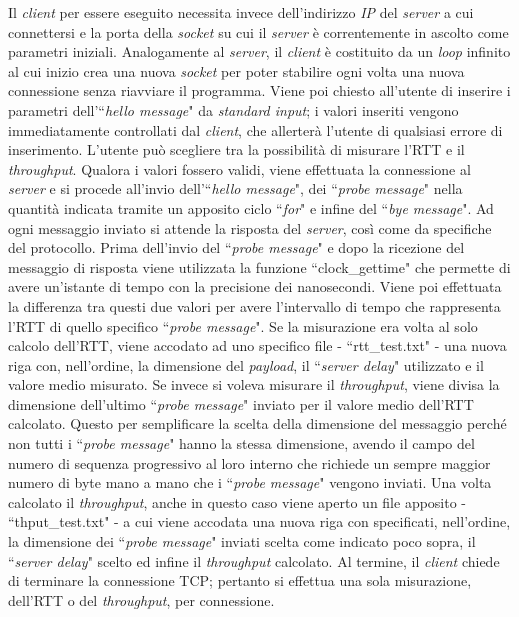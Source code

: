 \documentclass[a4paper, 12pt]{report}
\begin{document}
Il \textit{client} per essere eseguito necessita invece dell'indirizzo \textit{IP} del \textit{server} a cui connettersi e la porta della
\textit{socket} su cui il \textit{server} è correntemente in ascolto come parametri iniziali.\newline
Analogamente al \textit{server}, il \textit{client} è costituito da un \textit{loop} infinito al cui inizio crea una nuova \textit{socket} per poter 
stabilire ogni volta una nuova connessione senza riavviare il programma. Viene poi chiesto all'utente di inserire i parametri dell'``\textit{hello 
message}" da \textit{standard input}; i valori inseriti vengono immediatamente controllati dal \textit{client}, che allerterà l'utente di qualsiasi
errore di inserimento. L'utente può scegliere tra la possibilità di misurare l'RTT e il \textit{throughput}. Qualora i valori fossero validi,
viene effettuata la connessione al \textit{server} e si procede all'invio dell'``\textit{hello message}", dei ``\textit{probe message}" nella
quantità indicata tramite un apposito ciclo ``\textit{for}" e infine del ``\textit{bye message}". Ad ogni messaggio inviato si attende la risposta
del \textit{server}, così come da specifiche del protocollo.\newline
Prima dell'invio del ``\textit{probe message}" e dopo la ricezione del messaggio di risposta viene utilizzata la funzione ``clock\_gettime" che
permette di avere un'istante di tempo con la precisione dei nanosecondi. Viene poi effettuata la differenza tra questi due valori per avere
l'intervallo di tempo che rappresenta l'RTT di quello specifico ``\textit{probe message}". Se la misurazione era volta al solo calcolo
dell'RTT, viene accodato ad uno specifico file - ``rtt\_test.txt" - una nuova riga con, nell'ordine, la dimensione del \textit{payload}, 
il ``\textit{server delay}" utilizzato e il valore medio misurato.\newline
Se invece si voleva misurare il \textit{throughput}, viene divisa la dimensione dell'ultimo ``\textit{probe message}" inviato
per il valore medio dell'RTT calcolato. Questo per semplificare la scelta della dimensione del messaggio perché non tutti i ``\textit{probe
message}" hanno la stessa dimensione, avendo il campo del numero di sequenza progressivo al loro interno che richiede un sempre maggior numero di 
byte mano a mano che i ``\textit{probe message}" vengono inviati. Una volta calcolato il \textit{throughput}, anche in questo caso viene aperto un
file apposito - ``thput\_test.txt" - a cui viene accodata una nuova riga con specificati, nell'ordine, la dimensione dei ``\textit{probe message}" inviati
scelta come indicato poco sopra, il ``\textit{server delay}" scelto ed infine il \textit{throughput} calcolato.
Al termine, il \textit{client} chiede di terminare la connessione TCP; pertanto si effettua una sola misurazione, dell'RTT o del 
\textit{throughput}, per connessione.
\end{document}
